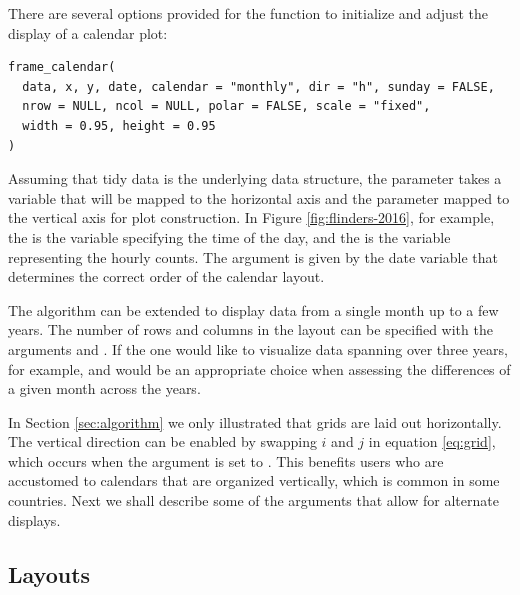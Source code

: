 \documentclass[article]{jss}
\theoremstyle{definition}
\theoremstyle{definition}
\theoremstyle{remark}
\begin{document}
\label{sec:opt}

There are several options provided for the 
function to initialize and adjust the display of a calendar plot:

\begin{verbatim}
frame_calendar(
  data, x, y, date, calendar = "monthly", dir = "h", sunday = FALSE, 
  nrow = NULL, ncol = NULL, polar = FALSE, scale = "fixed",
  width = 0.95, height = 0.95
)
\end{verbatim}

Assuming that tidy data \citep{wickham2014tidy} is the underlying data
structure, the parameter  takes a variable that will be mapped
to the horizontal axis and the parameter  mapped to the vertical
axis for plot construction. In Figure \ref{fig:flinders-2016}, for
example, the  is the variable specifying the time of the day,
and the  is the variable representing the hourly counts. The
 argument is given by the date variable that determines the
correct order of the calendar layout.

The algorithm can be extended to display data from a single month up to
a few years. The number of rows and columns in the layout can be
specified with the arguments  and . If the one
would like to visualize data spanning over three years, for example,
 and  would be an appropriate choice when
assessing the differences of a given month across the years.

In Section \ref{sec:algorithm} we only illustrated that grids are laid
out horizontally. The vertical direction can be enabled by swapping
\(i\) and \(j\) in equation \eqref{eq:grid}, which occurs when the
argument  is set to . This benefits users who are
accustomed to calendars that are organized vertically, which is common
in some countries. Next we shall describe some of the arguments that
allow for alternate displays.

\subsection{Layouts}\label{layouts}
\end{document}
